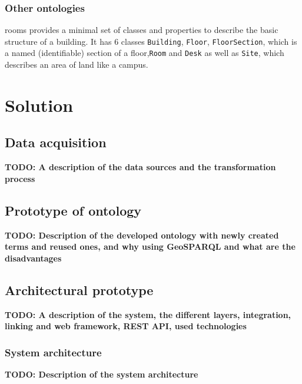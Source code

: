 \documentclass[draft,final]{vutinfth} %
\newcommand{\todo}[1]{{\color{red}\textbf{TODO: {#1}}}} %
\begin{document}
\subsection{Other ontologies}
\label{related-work-indoor-modelling-other-ontologies}
\gls{rooms} provides a minimal set of classes and properties to describe the basic structure of a building. It has 6 classes \texttt{Building}, \texttt{Floor}, \texttt{FloorSection}, which is a named (identifiable) section of a floor,\texttt{Room} and \texttt{Desk} as well as \texttt{Site}, which describes an area of land like a campus.




\chapter{Solution}
\label{solution-chapter}

\section{Data acquisition}
\label{solution-data-acquisition}
\todo{A description of the data sources and the transformation process}

\section{Prototype of ontology}
\label{solution-ontology-prototype}
\todo{Description of the developed ontology with newly created terms and reused ones, and why using GeoSPARQL and what are the disadvantages}

\section{Architectural prototype}
\label{solution-architectural-prototype}
\todo{A description of the system, the different layers, integration, linking and web framework, REST API, used technologies}

\subsection{System architecture}
\todo{Description of the system architecture}
\end{document}
